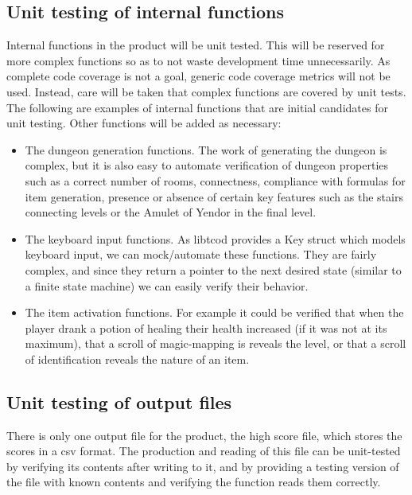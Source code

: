\documentclass[12pt, titlepage]{article}
\begin{document}
	\subsection{Unit testing of internal functions}
		Internal functions in the product will be unit tested. This will be reserved for more complex functions so as to not waste development time unnecessarily. As complete code coverage is not a goal, generic code coverage metrics will not be used. Instead, care will be taken that complex functions are covered by unit tests. The following are examples of internal functions that are initial candidates for unit testing. Other functions will be added as necessary:
		\begin{itemize}
			\item The dungeon generation functions. The work of generating the dungeon is complex, but it is also easy to automate verification of dungeon properties such as a correct number of rooms, connectness, compliance with formulas for item generation, presence or absence of certain key features such as the stairs connecting levels or the Amulet of Yendor in the final level.
			\item The keyboard input functions. As libtcod provides a Key struct which models keyboard input, we can mock/automate these functions. They are fairly complex, and since they return a pointer to the next desired state (similar to a finite state machine) we can easily verify their behavior.
			\item The item activation functions. For example it could be verified that when the player drank a potion of healing their health increased (if it was not at its maximum), that a scroll of magic-mapping is reveals the level, or that a scroll of identification reveals the nature of an item.
		\end{itemize}

	\subsection{Unit testing of output files}
		There is only one output file for the product, the high score file, which stores the scores in a csv format. The production and reading of this file can be unit-tested by verifying its contents after writing to it, and by providing a testing version of the file with known contents and verifying the function reads them correctly.

\newpage


\end{document}
